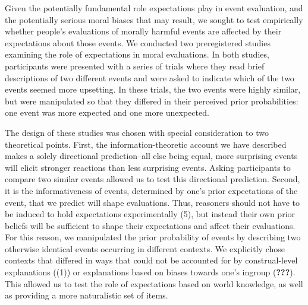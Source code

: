 \documentclass[9pt,twocolumn,twoside,]{pnas-new}
\begin{document}
Given the potentially fundamental role expectations play in event
evaluation, and the potentially serious moral biases that may result, we
sought to test empirically whether people's evaluations of morally
harmful events are affected by their expectations about those events. We
conducted two preregistered studies examining the role of expectations
in moral evaluations. In both studies, participants were presented with
a series of trials where they read brief descriptions of two different
events and were asked to indicate which of the two events seemed more
upsetting. In these trials, the two events were highly similar, but were
manipulated so that they differed in their perceived prior
probabilities: one event was more expected and one more unexpected.

The design of these studies was chosen with special consideration to two
theoretical points. First, the information-theoretic account we have
described makes a solely directional prediction--all else being equal,
more surprising events will elicit stronger reactions than less
surprising events. Asking participants to compare two similar events
allowed us to test this directional prediction. Second, it is the
informativeness of events, determined by one's prior expectations of the
event, that we predict will shape evaluations. Thus, reasoners should
not have to be induced to hold expectations experimentally (5), but
instead their own prior beliefs will be sufficient to shape their
expectations and affect their evaluations. For this reason, we
manipulated the prior probability of events by describing two otherwise
identical events occurring in different contexts. We explicitly chose
contexts that differed in ways that could not be accounted for by
construal-level explanations ((1)) or explanations based on biases
towards one's ingroup (\textbf{???}). This allowed us to test the role
of expectations based on world knowledge, as well as providing a more
naturalistic set of items.
\end{document}
